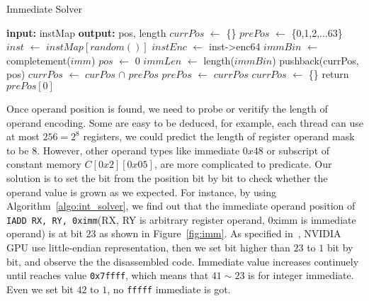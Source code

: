 \begin{algorithm}
      \caption{Immediate Solver}
      \label{algo:int_solver}
  \begin{algorithmic}[1]
	  \State \textbf{input:} instMap
      \State \textbf{output:} pos, length
      \State $currPos$ $\gets$ \{\}
      \State $prePos$ $\gets$ \{0,1,2,...63\}
      \State $inst$ $\gets$ $instMap[random()]$
      \State $instEnc$ $\gets$ inst->enc64
      \State $immBin$ $\gets$ completement($imm$)
      \State $pos$ $\gets$ 0
      \State $immLen$ $\gets$ length($immBin$)
      \State pushback(currPos, pos)
      \EndIf
      \EndWhile
      \State $currPos$ $\gets$ $curPos$ $\cap$ $prePos$
      \State $prePos$ $\gets$ $currPos$
      \State $currPos$ $\gets$ \{\}
      \EndIf
      \EndWhile
      \State return $prePos[0]$
  \end{algorithmic}
\end{algorithm}

Once operand position is found, we need to probe or veritify the length of operand encoding. Some are easy to be
deduced, for example, each thread can use at most $256=2^{8}$ registers, we could predict the length of register operand mask to be $8$.
However, other operand types like immediate $0x48$ or subscript of constant memory $C[0x2][0x05]$, are more complicated to predicate. Our solution is to set the bit from the position bit by bit to check whether the operand value is grown as we expected. For instance, by using Algorithm~\ref{algo:int_solver}, we find out that the immediate operand position of {\tt IADD RX, RY, 0ximm}(RX, RY is arbitrary register operand, 0ximm is immediate operand) is at bit $23$ as shown in Figure~\ref{fig:imm}. As specified in~\cite{cuda2015programming}, NVIDIA GPU use little-endian representation, then we set bit higher than $23$ to $1$ bit by bit, and observe the the disassembled code. Immediate value increases continuely until reaches value {\tt 0x7ffff}, which means that $41\sim23$ is for integer immediate. Even we set bit $42$ to $1$, no {\tt fffff} immediate is got. 

